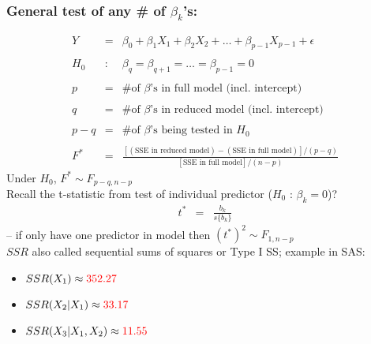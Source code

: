 \documentclass[12pt]{../notes}
\begin{document}
\subsubsection*{General test of any \# of $\beta_k$'s:}
\begin{eqnarray}
  Y & = & \beta_0 + \beta_1 X_1 + \beta_2 X_2 + \ldots + \beta_{p-1} X_{p-1} + \epsilon
  \nonumber \\
  & \nonumber \\
  H_0 & : & \beta_q = \beta_{q+1} = \ldots = \beta_{p-1} = 0   \nonumber \\
  & \nonumber \\
  p & = & \mbox{\# of $\beta$'s in full model (incl. intercept)} \nonumber\\
  & \nonumber \\
  q & = & \mbox{\# of $\beta$'s in reduced model (incl. intercept)} \nonumber\\
  & \nonumber \\
  p - q & = & \mbox{\# of $\beta$'s being tested in $H_0$} \nonumber \\
  & \nonumber \\
  F^* & = & \frac{[(\mbox{SSE in reduced model})-(\mbox{SSE in full model})] / (p-q)}{ [\mbox{SSE in full model}] /
  (n-p)} \nonumber
\end{eqnarray}
Under $H_0$, $F^* \sim F_{p-q,n-p}$\\


Recall the t-statistic from test of individual
predictor ($H_0$ : $\beta_k = 0$)?
\begin{eqnarray}
   t^* & = & \frac{b_k}{s\{ b_k \}} \nonumber
\end{eqnarray}
-- if only have one predictor in model then $(t^*)^2 \sim F_{1, n-p}$\\


$SSR$ also called sequential sums of squares or Type I SS; example
in SAS:
\begin{itemize}
  \item $SSR(X_1) \approx {\color{red} 352.27}$
  \item $SSR(X_2 | X_1) \approx {\color{red} 33.17}$
  \item $SSR(X_3 | X_1, X_2) \approx {\color{red} 11.55}$
\end{itemize}

\vspace{.5em}
\end{document}

